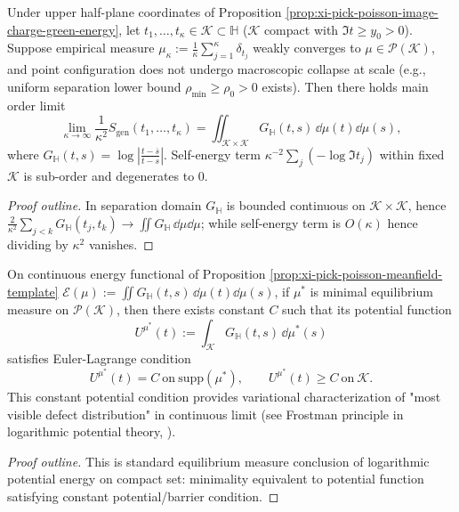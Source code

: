 \begin{proposition}\label{prop:xi-pick-poisson-meanfield-template}
Under upper half-plane coordinates of Proposition \ref{prop:xi-pick-poisson-image-charge-green-energy}, let \(t_1,\dots,t_\kappa\in\mathcal{K}\subset\mathbb{H}\) (\(\mathcal{K}\) compact with \(\Im t\ge y_0>0\)).
Suppose empirical measure \(\mu_\kappa:=\frac{1}{\kappa}\sum_{j=1}^{\kappa}\delta_{t_j}\) weakly converges to \(\mu\in\mathcal{P}(\mathcal{K})\), and point configuration does not undergo macroscopic collapse at scale (e.g., uniform separation lower bound \(\rho_{\min}\ge\rho_0>0\) exists).
Then there holds main order limit
\[
\boxed{\;
\lim_{\kappa\to\infty}\frac{1}{\kappa^2}S_{\mathrm{gen}}(t_1,\dots,t_\kappa)
=\iint_{\mathcal{K}\times\mathcal{K}}G_{\mathbb{H}}(t,s)\,\dd\mu(t)\dd\mu(s),\;}
\]
where \(G_{\mathbb{H}}(t,s)=\log\left|\frac{t-\overline s}{t-s}\right|\).
Self-energy term \(\kappa^{-2}\sum_j(-\log\Im t_j)\) within fixed \(\mathcal{K}\) is sub-order and degenerates to \(0\).
\end{proposition}
\begin{proof}[Proof outline]
In separation domain \(G_{\mathbb{H}}\) is bounded continuous on \(\mathcal{K}\times\mathcal{K}\), hence
\(
\frac{2}{\kappa^2}\sum_{j<k}G_{\mathbb{H}}(t_j,t_k)
\to \iint G_{\mathbb{H}}\,\dd\mu\dd\mu
\);
while self-energy term is \(O(\kappa)\) hence dividing by \(\kappa^2\) vanishes.
\end{proof}

\begin{corollary}\label{cor:xi-pick-poisson-equilibrium-euler-lagrange}
On continuous energy functional of Proposition \ref{prop:xi-pick-poisson-meanfield-template}
\(
\mathcal{E}(\mu):=\iint G_{\mathbb{H}}(t,s)\,\dd\mu(t)\dd\mu(s)
\),
if \(\mu^\ast\) is minimal equilibrium measure on \(\mathcal{P}(\mathcal{K})\), then there exists constant \(C\) such that its potential function
\[
U^{\mu^\ast}(t):=\int_{\mathcal{K}}G_{\mathbb{H}}(t,s)\,\dd\mu^\ast(s)
\]
satisfies Euler-Lagrange condition
\[
\boxed{\;
U^{\mu^\ast}(t)=C\ \text{on}\ \mathrm{supp}(\mu^\ast),\qquad
U^{\mu^\ast}(t)\ge C\ \text{on}\ \mathcal{K}.\;}
\]
This constant potential condition provides variational characterization of "most visible defect distribution" in continuous limit (see Frostman principle in logarithmic potential theory, \cite{SaffTotik1997LogarithmicPotentials}).
\end{corollary}
\begin{proof}[Proof outline]
This is standard equilibrium measure conclusion of logarithmic potential energy on compact set: minimality equivalent to potential function satisfying constant potential/barrier condition.
\end{proof}

